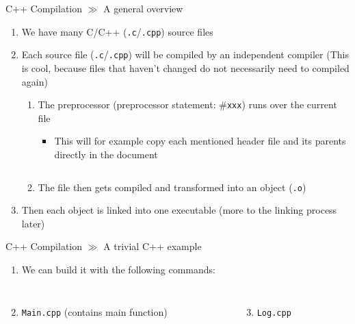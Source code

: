 \documentclass[10pt]{beamer}
\begin{document}
\begin{frame}{C++ Compilation $\gg$ A general overview}
\begin{enumerate}
	\item We have many C/C++ (\texttt{.c}/\texttt{.cpp}) source files
	\item Each source file (\texttt{.c}/\texttt{.cpp}) will be compiled by an independent compiler (This is cool, because files that haven't changed do not necessarily need to compiled again)
	\begin{enumerate}
		\item The preprocessor (preprocessor statement: \#\texttt{xxx}) runs over the current file
		\begin{itemize}
			\item This will for example copy each mentioned header file and its parents directly in the document
			\inputminted[bgcolor=lightGreyCustom,fontsize=\scriptsize]{sh}{./resources/preprocessor_statement.h}
		\end{itemize}
		\item The file then gets compiled and transformed into an object (\texttt{.o})
	\end{enumerate}
	\item Then each object is linked into one executable (more to the linking process later)
\end{enumerate}
\end{frame}

\begin{frame}{C++ Compilation $\gg$ A trivial C++ example}
\begin{enumerate}
	\item We can build it with the following commands:
	\inputminted[bgcolor=lightGreyCustom,fontsize=\scriptsize,firstline=3,lastline=4]{sh}{./resources/Compilation_example/build.sh}
\end{enumerate}
\vspace{-5mm}
\begin{columns}
	\begin{column}{0.57\textwidth}
		\begin{enumerate}\setcounter{enumi}{1}
			\item \texttt{Main.cpp} (contains main function)
			\inputminted[bgcolor=lightGreyCustom,fontsize=\scriptsize]{c}{./resources/Compilation_example/Main.cpp}
		\end{enumerate}
	\end{column}
	\begin{column}{0.57\textwidth}
		\begin{enumerate}\setcounter{enumi}{2}
			\item \texttt{Log.cpp}
			\inputminted[bgcolor=lightGreyCustom,fontsize=\scriptsize]{c}{./resources/Compilation_example/Log.cpp}
		\end{enumerate}
	\end{column}
\end{columns}
\end{frame}
\end{document}

